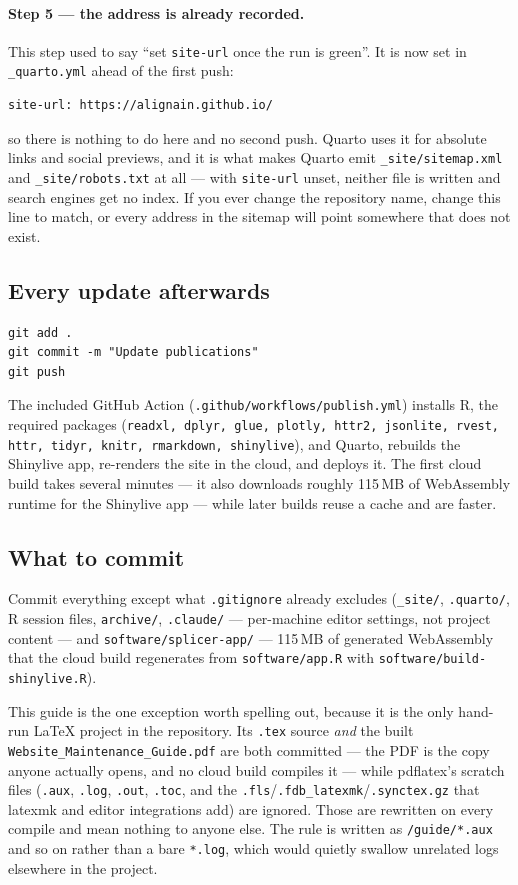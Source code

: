 \documentclass[11pt,a4paper]{article}
\newcommand{\file}[1]{\texttt{#1}}
\begin{document}
\paragraph{Step 5 --- the address is already recorded.} This step used to
say ``set \texttt{site-url} once the run is green''. It is now set in
\file{\_quarto.yml} ahead of the first push:
\begin{lstlisting}
site-url: https://alignain.github.io/
\end{lstlisting}
so there is nothing to do here and no second push. Quarto uses it for
absolute links and social previews, and it is what makes Quarto emit
\file{\_site/sitemap.xml} and \file{\_site/robots.txt} at all --- with
\texttt{site-url} unset, neither file is written and search engines get no
index. If you ever change the repository name, change this line to match, or
every address in the sitemap will point somewhere that does not exist.

\subsection{Every update afterwards}

\begin{lstlisting}
git add .
git commit -m "Update publications"
git push
\end{lstlisting}

The included GitHub Action (\file{.github/workflows/publish.yml}) installs
R, the required packages (\texttt{readxl, dplyr, glue, plotly, httr2,
jsonlite, rvest, httr, tidyr, knitr, rmarkdown, shinylive}), and Quarto,
rebuilds the Shinylive app, re-renders the site in the cloud, and deploys
it. The first cloud build takes several minutes --- it also downloads
roughly 115\,MB of WebAssembly runtime for the Shinylive app --- while
later builds reuse a cache and are faster.

\subsection{What to commit}
Commit everything except what \file{.gitignore} already excludes
(\file{\_site/}, \file{.quarto/}, R session files, \file{archive/},
\file{.claude/} --- per-machine editor settings, not project content --- and
\file{software/splicer-app/} --- 115\,MB of generated WebAssembly that the
cloud build regenerates from \file{software/app.R} with
\file{software/build-shinylive.R}).

This guide is the one exception worth spelling out, because it is the only
hand-run \LaTeX{} project in the repository. Its \file{.tex} source
\emph{and} the built \file{Website\_Maintenance\_Guide.pdf} are both
committed --- the PDF is the copy anyone actually opens, and no cloud build
compiles it --- while pdflatex's scratch files
(\file{.aux}, \file{.log}, \file{.out}, \file{.toc}, and the
\file{.fls}/\file{.fdb\_latexmk}/\file{.synctex.gz} that latexmk and editor
integrations add) are ignored. Those are rewritten on every compile and mean
nothing to anyone else. The rule is written as \file{/guide/*.aux} and so on
rather than a bare \file{*.log}, which would quietly swallow unrelated logs
elsewhere in the project.
\end{document}
